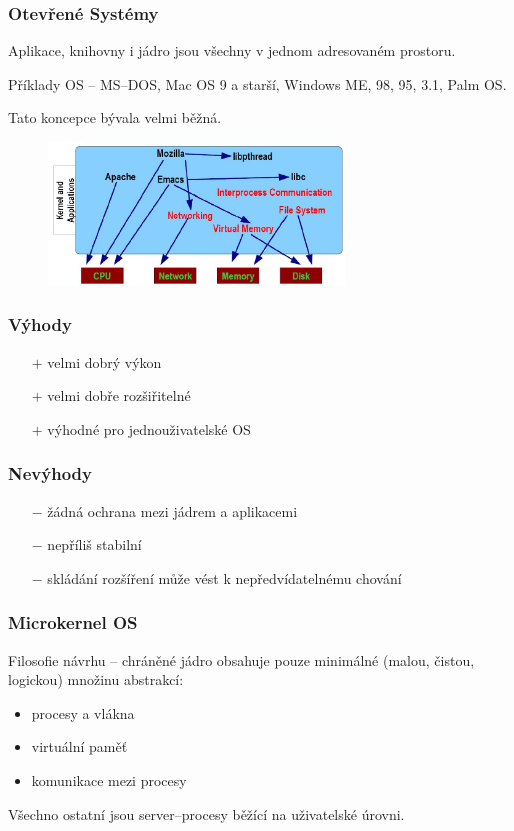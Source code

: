 \subsubsection{Otevřené Systémy}
Aplikace, knihovny i jádro jsou všechny v jednom adresovaném prostoru.

Příklady OS -- MS--DOS, Mac OS 9 a starší, Windows ME, 98, 95, 3.1, Palm OS.

Tato koncepce bývala velmi běžná.
\begin{figure}[H]
\centering
\includegraphics[width=0.7\textwidth]{assets/3_open_sys}
\end{figure}
\subsubsection*{Výhody}
\begin{itemize}
	\item[$+$] velmi dobrý výkon
	\item[$+$] velmi dobře rozšiřitelné
	\item[$+$] výhodné pro jednouživatelské OS
\end{itemize}
\subsubsection*{Nevýhody}
\begin{itemize}
	\item[$-$] žádná ochrana mezi jádrem a aplikacemi
	\item[$-$] nepříliš stabilní
	\item[$-$] skládání rozšíření může vést k nepředvídatelnému chování
\end{itemize}

\subsubsection{Microkernel OS}
Filosofie návrhu -- chráněné jádro obsahuje pouze minimálné (malou, čistou, logickou) množinu abstrakcí:
\begin{itemize}
	\item procesy a vlákna
	\item virtuální paměť
	\item komunikace mezi procesy
\end{itemize}
Všechno ostatní jsou server--procesy běžící na uživatelské úrovni.

